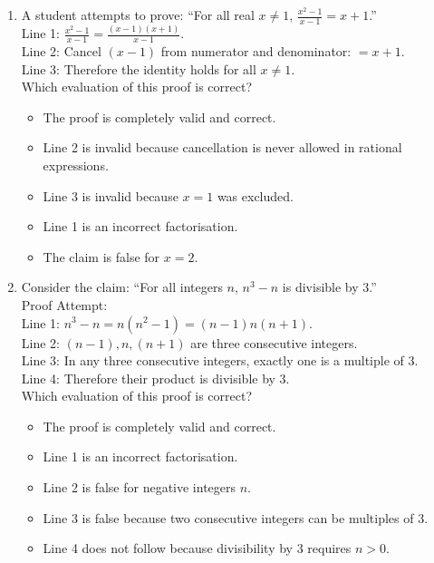 \documentclass[11pt,a4paper]{article}
\begin{document}
\begin{enumerate}
\item A student attempts to prove: ``For all real $x \neq 1$, $\frac{x^2-1}{x-1} = x+1$.''\\
Line 1: $\frac{x^2-1}{x-1} = \frac{(x-1)(x+1)}{x-1}$.\\
Line 2: Cancel $(x-1)$ from numerator and denominator: $= x+1$.\\
Line 3: Therefore the identity holds for all $x \neq 1$.\\
Which evaluation of this proof is correct?
\begin{itemize}
\item[A)] The proof is completely valid and correct.
\item[B)] Line 2 is invalid because cancellation is never allowed in rational expressions.
\item[C)] Line 3 is invalid because $x=1$ was excluded.
\item[D)] Line 1 is an incorrect factorisation.
\item[E)] The claim is false for $x=2$.
\end{itemize}

\item Consider the claim: ``For all integers $n$, $n^3 - n$ is divisible by $3$.''\\
Proof Attempt:\\
Line 1: $n^3 - n = n(n^2 - 1) = (n-1)n(n+1)$.\\
Line 2: $(n-1), n, (n+1)$ are three consecutive integers.\\
Line 3: In any three consecutive integers, exactly one is a multiple of $3$.\\
Line 4: Therefore their product is divisible by $3$.\\
Which evaluation of this proof is correct?
\begin{itemize}
\item[A)] The proof is completely valid and correct.
\item[B)] Line 1 is an incorrect factorisation.
\item[C)] Line 2 is false for negative integers $n$.
\item[D)] Line 3 is false because two consecutive integers can be multiples of $3$.
\item[E)] Line 4 does not follow because divisibility by $3$ requires $n > 0$.
\end{itemize}

\end{enumerate}

\end{document}
